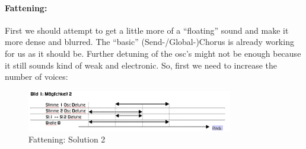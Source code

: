 \paragraph{Fattening:}
First we should attempt to get a little more of a ``floating'' sound and make it more dense and blurred. The ``basic'' (Send-/Global-)Chorus is already working for us as it should be. Further detuning of the osc's might not be enough because it still sounds kind of weak and electronic. So, first we need to increase the number of voices:
\bigskip %
%
\begin{figure}[ht!]
	\centering
	\includegraphics[width=90mm]{pics/vocal_workshop1_sol_2.gif}
	\caption{Fattening: Solution 2}
	\label{vocal_1_sol_2}
\end{figure}
